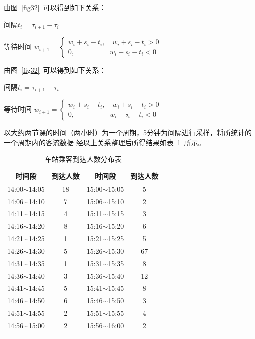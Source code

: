 由图~\ref{fig32}~可以得到如下关系：

间隔\quad \quad \quad \quad$t_i = \tau_{i+1} - \tau_i$

等待时间 \quad \quad 
$
w_{i+1} = 
\begin{cases}
    w_i + s_i - t_i,\quad w_i + s_i - t_i > 0
    \\
   0, \qquad \qquad \quad w_i + s_i - t_i < 0
\end{cases}
$



由图~\ref{fig32}~可以得到如下关系：

间隔\quad \quad \quad \quad$t_i = \tau_{i+1} - \tau_i$

等待时间 \quad \quad 
$
w_{i+1} = 
\begin{cases}
    w_i + s_i - t_i,\quad w_i + s_i - t_i > 0
    \\
   0, \qquad \qquad \quad w_i + s_i - t_i < 0
\end{cases}
$



以大约两节课的时间（两小时）为一个周期，5分钟为间隔进行采样，将所统计的一个周期内的客流数据
经以上关系整理后所得结果如表~\ref{table_1}~所示。
\begin{table}[htbp!]
    \centering
    \caption{车站乘客到达人数分布表}\label{table_1}
    
    \begin{tabular}{cccc}
    \whline 
    时间段 & 到达人数 & 时间段 & 到达人数 \\ 
    \hline 
    14:00$ \sim $14:05 & 18 &15:00$ \sim $15:05&5\\ 
    14:06$ \sim $14:10 & 7 &15:06$ \sim $15:10&2\\ 
    14:11$ \sim $14:15 & 4 &15:11$ \sim $15:15&3\\ 
    14:16$ \sim $14:20 & 8 &15:16$ \sim $15:20&6\\ 
    14:21$ \sim $14:25 & 1 &15:21$ \sim $15:25&5\\ 
    14:26$ \sim $14:30 & 5 &15:26$ \sim $15:30&67\\ 
    14:31$ \sim $14:35 & 1 &15:31$ \sim $15:35&8\\ 
    14:36$ \sim $14:40 & 3 &15:36$ \sim $15:40&12\\ 
    14:41$ \sim $14:45 & 5 &15:41$ \sim $15:45&8\\ 
    14:46$ \sim $14:50 & 6 &15:46$ \sim $15:50&3\\ 
    14:51$ \sim $14:55 & 2 &15:51$ \sim $15:55&4\\ 
    14:56$ \sim $15:00 & 2 &15:56$ \sim $16:00&2\\ 
    \whline 
    \end{tabular}
    \end{table}

